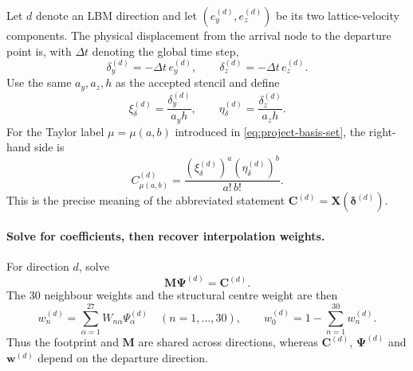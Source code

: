 \documentclass[11pt,a4paper]{article}
\begin{document}
Let $d$ denote an LBM direction and let
$(e_y^{(d)},e_z^{(d)})$ be its two lattice-velocity components. The physical displacement
from the arrival node to the departure point is, with $\Delta t$ denoting the global
time step,
\begin{equation}
 \delta_y^{(d)}=-\Delta t\,e_y^{(d)},\qquad
 \delta_z^{(d)}=-\Delta t\,e_z^{(d)}.
\label{eq:project-departure-displacement}
\end{equation}
Use the same $a_y,a_z,h$ as the accepted stencil and define
\begin{equation}
 \xi_\delta^{(d)}=\frac{\delta_y^{(d)}}{a_yh},\qquad
 \eta_\delta^{(d)}=\frac{\delta_z^{(d)}}{a_zh}.
\label{eq:project-departure-normalised}
\end{equation}
For the Taylor label $\mu=\mu(a,b)$ introduced in
\eqref{eq:project-basis-set}, the right-hand side is
\begin{equation}
 C_{\mu(a,b)}^{(d)}
 =\frac{(\xi_\delta^{(d)})^a(\eta_\delta^{(d)})^b}{a!\,b!}.
\label{eq:project-direction-rhs}
\end{equation}
This is the precise meaning of the abbreviated statement
$\bm C^{(d)}=\bm X(\bm\delta^{(d)})$.

\paragraph{Solve for coefficients, then recover interpolation weights.}
For direction $d$, solve
\begin{equation}
 \bm M\bm\Psi^{(d)}=\bm C^{(d)}.
\label{eq:project-direction-solve}
\end{equation}
The 30 neighbour weights and the structural centre weight are then
\begin{equation}
 w_n^{(d)}=\sum_{\alpha=1}^{27}
 W_{n\alpha}\Psi_\alpha^{(d)}
 \quad (n=1,\ldots,30),\qquad
 w_0^{(d)}=1-\sum_{n=1}^{30}w_n^{(d)}.
\label{eq:project-direction-weights}
\end{equation}
Thus the footprint and $\bm M$ are shared across directions, whereas
$\bm C^{(d)}$, $\bm\Psi^{(d)}$ and $\bm w^{(d)}$ depend on the departure direction.
\end{document}
